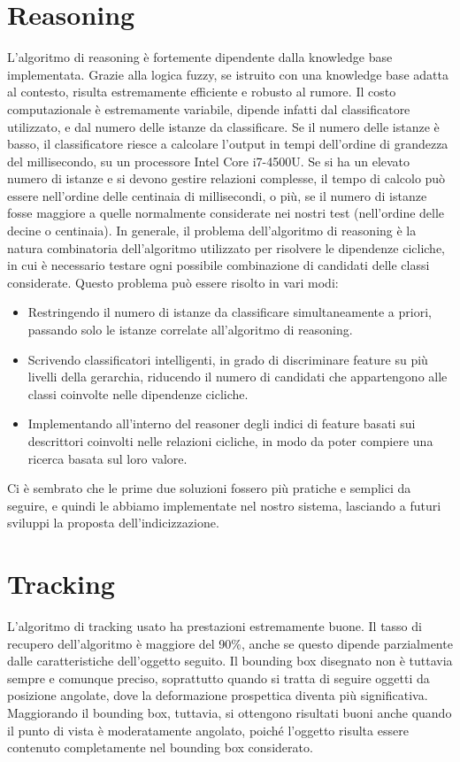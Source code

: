 \clearpage

\section{Reasoning}
L'algoritmo di reasoning è fortemente dipendente dalla knowledge base implementata. Grazie alla logica fuzzy, se istruito con una knowledge base adatta al contesto, risulta estremamente efficiente e robusto al rumore. Il costo computazionale è estremamente variabile, dipende infatti dal classificatore utilizzato, e dal numero delle istanze da classificare. Se il numero delle istanze è basso, il classificatore riesce a calcolare l'output in tempi dell'ordine di grandezza del millisecondo, su un processore Intel Core i7-4500U.
Se si ha un elevato numero di istanze e si devono gestire relazioni complesse, il tempo di calcolo può essere nell'ordine delle centinaia di millisecondi, o più, se il numero di istanze fosse maggiore a quelle normalmente considerate nei nostri test (nell'ordine delle decine o centinaia).
In generale, il problema dell'algoritmo di reasoning è la natura combinatoria dell'algoritmo utilizzato per risolvere le dipendenze cicliche, in cui è necessario testare ogni possibile combinazione di candidati delle classi considerate. Questo problema può essere risolto in vari modi: 
\begin{itemize}
 \item Restringendo il numero di istanze da classificare simultaneamente a priori, passando solo le istanze correlate all'algoritmo di reasoning.
 \item Scrivendo classificatori intelligenti, in grado di discriminare feature su più livelli della gerarchia, riducendo il numero di candidati che appartengono alle classi coinvolte nelle dipendenze cicliche.
 \item Implementando all'interno del reasoner degli indici di feature basati sui descrittori coinvolti nelle relazioni cicliche, in modo da poter compiere una ricerca basata sul loro valore.
\end{itemize}
Ci è sembrato che le prime due soluzioni fossero più pratiche e semplici da seguire, e quindi le abbiamo implementate nel nostro sistema, lasciando a futuri sviluppi la proposta dell'indicizzazione.

\clearpage

\section{Tracking}
L'algoritmo di tracking usato ha prestazioni estremamente buone. Il tasso di recupero dell'algoritmo è maggiore del 90\%, anche se questo dipende parzialmente dalle caratteristiche dell'oggetto seguito. Il bounding box disegnato non è tuttavia sempre e comunque preciso, soprattutto quando si tratta di seguire oggetti da posizione angolate, dove la deformazione prospettica diventa più significativa. Maggiorando il bounding box, tuttavia, si ottengono risultati buoni anche quando il punto di vista è moderatamente angolato, poiché l'oggetto risulta essere contenuto completamente nel bounding box considerato.

